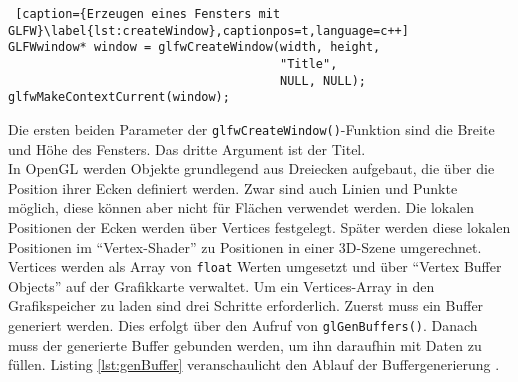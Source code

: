 \documentclass[11pt,a4paper]{article}
\begin{document}

\begin{lstlisting} [caption={Erzeugen eines Fensters mit GLFW}\label{lst:createWindow},captionpos=t,language=c++]
GLFWwindow* window = glfwCreateWindow(width, height,
                                      "Title",
                                      NULL, NULL);
glfwMakeContextCurrent(window);
\end{lstlisting}
\noindent
Die ersten beiden Parameter der \lstinline!glfwCreateWindow()!-Funktion sind die Breite und Höhe des Fensters. Das dritte Argument ist der Titel.\\
In OpenGL werden Objekte grundlegend aus Dreiecken aufgebaut, die über die Position ihrer Ecken definiert werden. Zwar sind auch Linien  und Punkte möglich, diese können aber nicht für Flächen verwendet werden. Die lokalen Positionen der Ecken werden über Vertices festgelegt. Später werden diese lokalen Positionen im ``Vertex-Shader'' zu Positionen in einer 3D-Szene umgerechnet.\\
Vertices werden als Array von \lstinline!float! Werten umgesetzt und über ``Vertex Buffer Objects'' auf der Grafikkarte verwaltet. Um ein Vertices-Array in den Grafikspeicher zu laden sind drei Schritte erforderlich. Zuerst muss ein Buffer generiert werden. Dies erfolgt über den Aufruf von \lstinline!glGenBuffers()!. Danach muss der generierte Buffer gebunden werden, um ihn daraufhin mit Daten zu füllen. Listing \ref{lst:genBuffer} veranschaulicht den Ablauf der Buffergenerierung \cite[Hello-Triangle]{LearnOpenGL}.
\end{document}
